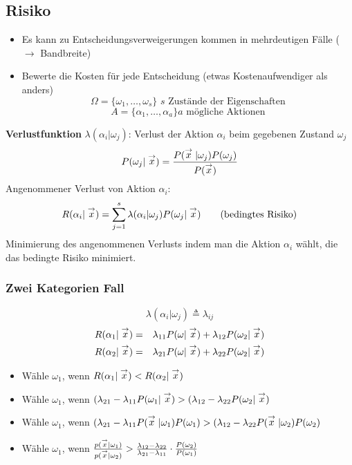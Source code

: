 \subsection{Risiko}

\begin{itemize}
\item Es kann zu Entscheidungsverweigerungen kommen in mehrdeutigen Fälle ($\to$ Bandbreite)
\item Bewerte die Kosten für jede Entscheidung (etwas Kostenaufwendiger als anders) $$\Omega = \{ \omega_1, \dots, \omega_s \} \,\, s \textrm{ Zustände der Eigenschaften}$$ $$A = \{ \alpha_1, \dots, \alpha_a \} a \textrm{ mögliche Aktionen}$$
\end{itemize}

\textbf{Verlustfunktion}
$\lambda(\alpha_i | \omega_j)$: Verlust der Aktion $\alpha_i$ beim gegebenen Zustand $\omega_j$ $$P(\omega_j | \stackrel{\to}{x}) = \frac{P(\stackrel{\to}{x} | \omega_j) P(\omega_j)}{P(\stackrel{\to}{x})}$$
Angenommener Verlust von Aktion $\alpha_i$: $$R(\alpha_i | \stackrel{\to}{x}) = \sum\limits_{j=1}^s \lambda(\alpha_i | \omega_j) P(\omega_j | \stackrel{\to}{x}) \qquad \textrm{(bedingtes Risiko)}$$
Minimierung des angenommenen Verlusts indem man die Aktion $\alpha_i$ wählt, die das bedingte Risiko minimiert.
\subsubsection*{Zwei Kategorien Fall}
$$\lambda(\alpha_i | \omega_j) \triangleq \lambda_{ij}$$
\begin{eqnarray*}
R(\alpha_1 | \stackrel{\to}{x}) &=& \lambda_{11} P(\omega | \stackrel{\to}{x}) + \lambda_{12} P(\omega_2 | \stackrel{\to}{x}) \\
R(\alpha_2 | \stackrel{\to}{x}) &=& \lambda_{21} P(\omega | \stackrel{\to}{x}) + \lambda_{22} P(\omega_2 | \stackrel{\to}{x}) \\
\end{eqnarray*}

\begin{itemize}
\item Wähle $\omega_1$, wenn $R(\alpha_1 | \stackrel{\to}{x}) < R(\alpha_2 | \stackrel{\to}{x})$
\item Wähle $\omega_1$, wenn $(\lambda_{21} - \lambda_{11} P(\omega_1 | \stackrel{\to}{x}) > (\lambda_{12} - \lambda_{22} P(\omega_2 | \stackrel{\to}{x})$
\item Wähle $\omega_1$, wenn $(\lambda_{21} - \lambda_{11} P(\stackrel{\to}{x} | \omega_1)P(\omega_1) > (\lambda_{12} - \lambda_{22} P(\stackrel{\to}{x} | \omega_2) P(\omega_2)$
\item Wähle $\omega_1$, wenn $\frac{p(\stackrel{\to}{x} | \omega_1)}{p(\stackrel{\to}{x} | \omega_2)} > \frac{\lambda_{12} - \lambda_{22}}{\lambda_{21} - \lambda_{11}} \cdot \frac{P(\omega_2)}{P(\omega_1)}$
\end{itemize}






